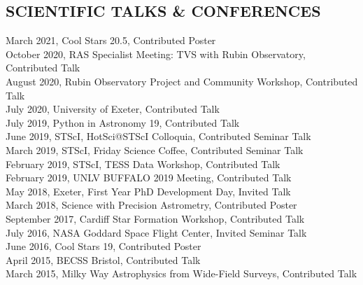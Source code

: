 \documentclass[letter, margin, 10pt]{res} %
\begin{document}
\begin{resume}

\parskip \baselineskip
\vspace{-6pt}
\section{SCIENTIFIC TALKS \& CONFERENCES}

March 2021, Cool Stars 20.5, Contributed Poster\\
October 2020, RAS Specialist Meeting: TVS with Rubin Observatory, Contributed Talk\\
August 2020, Rubin Observatory Project and Community Workshop, Contributed Talk\\
July 2020, University of Exeter, Contributed Talk\\
July 2019, Python in Astronomy 19, Contributed Talk\\
June 2019, STScI, HotSci@STScI Colloquia, Contributed Seminar Talk\\
March 2019, STScI, Friday Science Coffee, Contributed Seminar Talk\\
February 2019, STScI, TESS Data Workshop, Contributed Talk\\
February 2019, UNLV BUFFALO 2019 Meeting, Contributed Talk\\
May 2018, Exeter, First Year PhD Development Day, Invited Talk\\
March 2018, Science with Precision Astrometry, Contributed Poster\\
September 2017, Cardiff Star Formation Workshop, Contributed Talk\\
July 2016, NASA Goddard Space Flight Center, Invited Seminar Talk\\
June 2016, Cool Stars 19, Contributed Poster\\
April 2015, BECSS Bristol, Contributed Talk\\
March 2015, Milky Way Astrophysics from Wide-Field Surveys, Contributed Talk

 \vspace{-6pt}

\end{resume}
\end{document}
